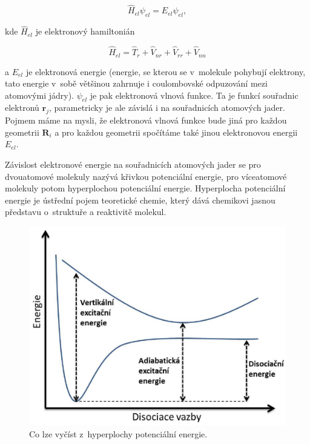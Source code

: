 \begin{equation}
\hat{H}_{el}\psi_{el}=E_{el}\psi_{el},
\end{equation}

\noindent kde $\hat{H}_{el}$ je elektronový hamiltonián

\begin{equation}
\hat{H}_{el}=\hat{T}_r+\hat{V}_{nr}+\hat{V}_{rr}+\hat{V}_{nn}
\end{equation}

\noindent a $E_{el}$ je elektronová energie (energie, se kterou se v~molekule pohybují elektrony, tato energie v~sobě většinou zahrnuje i coulombovské odpuzování mezi atomovými jádry). $\psi_{el}$ je pak elektronová vlnová funkce. Ta je funkcí souřadnic elektronů $\textbf{r}_j$, parametricky je ale závislá i na souřadnicích atomových jader. Pojmem  máme na mysli, že elektronová vlnová funkce bude jiná pro každou geometrii $\textbf{R}_i$ a pro každou geometrii spočítáme také jinou elektronovou energii $E_{el}$. 

Závislost elektronové energie na souřadnicích atomových jader se pro dvouatomové molekuly nazývá křivkou potenciální energie, pro víceatomové molekuly potom hyperplochou potenciální energie. Hyperplocha potenciální energie je ústřední pojem teoretické chemie, který dává chemikovi jasnou představu o~struktuře a reaktivitě molekul. 

\begin{figure} [ht]
\centering
\includegraphics[scale=0.6]{obrazky/disociace2.eps}
\caption[Disociace]{Co lze vyčíst z~hyperplochy potenciální energie.}
\label{obr:mol:disociace2}
\end{figure}

